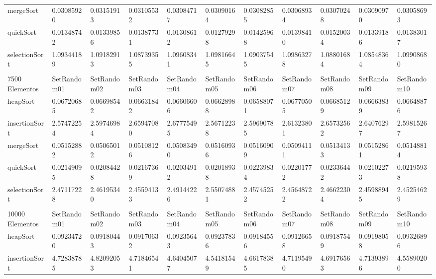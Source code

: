 \documentclass[article,a4paper]{article}
\begin{document}
\begin{table}[h]
{\begin{tabular}{lllllllllll}
mergeSort       & 0.03085920  & 0.03151913  & 0.03105532  & 0.03084717  & 0.03090164  & 0.03082855  & 0.03068934  & 0.03070248  & 0.03090970  & 0.03058693  \\
quickSort       & 0.01348742  & 0.01339856  & 0.01387731  & 0.01308612  & 0.01279298  & 0.01425968  & 0.01398410  & 0.01520034  & 0.01339186  & 0.01383017  \\
selectionSort   & 1.09344189  & 1.09182913  & 1.08739355  & 1.09608341  & 1.09816645  & 1.09037545  & 1.09863278  & 1.08801684  & 1.08548364  & 1.09908680  \\
                &             &             &             &             &             &             &             &             &             &             \\
7500 Elementos  & SetRandom01 & SetRandom02 & SetRandom03 & SetRandom04 & SetRandom05 & SetRandom06 & SetRandom07 & SetRandom08 & SetRandom09 & SetRandom10 \\
heapSort        & 0.06720685  & 0.06698542  & 0.06631842  & 0.06606606  & 0.06628988  & 0.06588071  & 0.06770505  & 0.06685129  & 0.06663839  & 0.06648876  \\
insertionSort   & 2.57472254  & 2.59746984  & 2.65947080  & 2.67775495  & 2.56712238  & 2.59690785  & 2.61323801  & 2.65732562  & 2.64076297  & 2.59815267  \\
mergeSort       & 0.05152882  & 0.05065012  & 0.05108126  & 0.05083490  & 0.05160936  & 0.05160909  & 0.05094111  & 0.05134133  & 0.05152861  & 0.05148814  \\
quickSort       & 0.02149095  & 0.02084428  & 0.02167369  & 0.02034912  & 0.02018938  & 0.02239834  & 0.02201772  & 0.02336442  & 0.02102273  & 0.02195938  \\
selectionSort   & 2.47117228  & 2.46195340  & 2.45594133  & 2.49144226  & 2.55074881  & 2.45745252  & 2.45648722  & 2.46622304  & 2.45988945  & 2.45254629  \\
                &             &             &             &             &             &             &             &             &             &             \\
10000 Elementos & SetRandom01 & SetRandom02 & SetRandom03 & SetRandom04 & SetRandom05 & SetRandom06 & SetRandom07 & SetRandom08 & SetRandom09 & SetRandom10 \\
heapSort        & 0.09234720  & 0.09180443  & 0.09170632  & 0.09235643  & 0.09237836  & 0.09184556  & 0.09126658  & 0.09187549  & 0.09198058  & 0.09326896  \\
insertionSort   & 4.72838785  & 4.82092053  & 4.71846541  & 4.64045077  & 4.54181549  & 4.66178385  & 4.71195490  & 4.69176563  & 4.71393896  & 4.55890200  \\

\end{tabular}}
\end{table}
\end{document}
